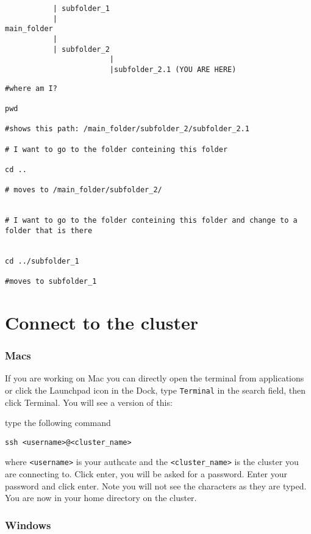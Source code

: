 \documentclass[
]{book}
\begin{document}
\begin{verbatim}
           | subfolder_1 
           | 
main_folder
           |
           | subfolder_2
                        |
                        |subfolder_2.1 (YOU ARE HERE)
\end{verbatim}

\begin{verbatim}
#where am I?

pwd

#shows this path: /main_folder/subfolder_2/subfolder_2.1

# I want to go to the folder conteining this folder

cd ..

# moves to /main_folder/subfolder_2/


# I want to go to the folder conteining this folder and change to a folder that is there


cd ../subfolder_1

#moves to subfolder_1
\end{verbatim}

\hypertarget{connect-to-the-cluster}{%
\chapter{Connect to the cluster}\label{connect-to-the-cluster}}

\hypertarget{macs}{%
\subsection{Macs}\label{macs}}

If you are working on Mac you can directly open the terminal from applications or click the Launchpad icon in the Dock, type \texttt{Terminal} in the search field, then click Terminal. You will see a version of this:

type the following command

\begin{verbatim}
ssh <username>@<cluster_name>
\end{verbatim}

where \texttt{\textless{}username\textgreater{}} is your authcate and the \texttt{\textless{}cluster\_name\textgreater{}} is the cluster you are connecting to. Click enter, you will be asked for a password. Enter your password and click enter. Note you will not see the characters as they are typed. You are now in your home directory on the cluster.

\hypertarget{windows}{%
\subsection{Windows}\label{windows}}
\end{document}
